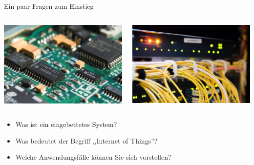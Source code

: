 \begin{frame}{Ein paar Fragen zum Einstieg}
    \begin{columns}
        \begin{column}[b]{.5\textwidth}
            \begin{center}
                \includegraphics[width=\textwidth]{img/iot-hardware}
            \end{center}
        \end{column}
        \begin{column}[b]{.5\textwidth}
            \begin{center}
                \includegraphics[width=\textwidth]{img/iot-backend}
            \end{center}
        \end{column}
    \end{columns}

    \bigskip

    \begin{itemize}
        \item Was ist ein eingebettetes System?
        \item Was bedeutet der Begriff ,,Internet of Things''?
        \item Welche Anwendungsfälle können Sie sich vorstellen?
    \end{itemize}
\end{frame}

